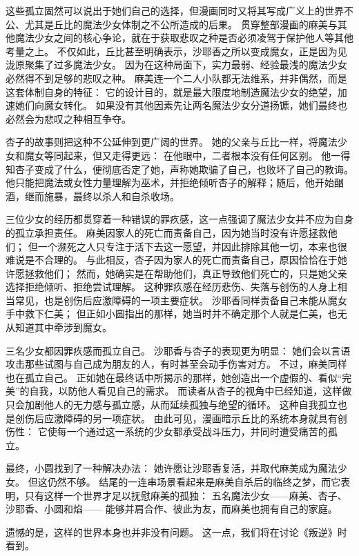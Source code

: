 这些孤立固然可以说出于她们自己的选择，但漫画同时又将其写成广义上的世界不公、尤其是丘比的魔法少女体制之不公所造成的后果。
贯穿整部漫画的麻美与其他魔法少女之间的核心争论，就在于获取悲叹之种是否必须凌驾于保护他人等其他考量之上。
不仅如此，丘比甚至明确表示，沙耶香之所以变成魔女，正是因为见泷原聚集了过多魔法少女。
因为在这种局面下，实力最弱、经验最浅的魔法少女必然得不到足够的悲叹之种。
麻美连一个二人小队都无法维系，并非偶然，而是这套体制自身的特征：
它的设计目的，就是最大限度地制造魔法少女的绝望，加速她们向魔女转化。
如果没有其他因素先让两名魔法少女分道扬镳，她们最终也必然会为悲叹之种相互争夺。

杏子的故事则把这种不公延伸到更广阔的世界。
她的父亲与丘比一样，将魔法少女和魔女等同起来，但又走得更远：
在他眼中，二者根本没有任何区别。
他一得知杏子变成了什么，便彻底否定了她，声称她欺骗了自己，也败坏了自己的教诲。
他只能把魔法或女性力量理解为巫术，并拒绝倾听杏子的解释；随后，他开始酗酒，继而施暴，最终以杀人和自杀收场。

三位少女的经历都贯穿着一种错误的罪疚感，这一点强调了魔法少女并不应为自身的孤立承担责任。
麻美因家人的死亡而责备自己，因为她当时没有许愿拯救他们；
但一个濒死之人只专注于活下去这一愿望，并因此排除其他一切，本来也很难说是不合理的。
与此相反，杏子因为家人的死亡而责备自己，原因恰恰在于她许愿拯救他们；
然而，她确实是在帮助他们，真正导致他们死亡的，只是她父亲选择拒绝倾听、拒绝尝试理解。
这种罪疚感在经历悲伤、失落与创伤的人身上相当常见，也是创伤后应激障碍的一项主要症状\cite{ref106}。
沙耶香同样责备自己未能从魔女手中救下仁美；
但正如小圆指出的那样，她当时并不确定那个人就是仁美，也无从知道其中牵涉到魔女。

三名少女都因罪疚感而孤立自己。
沙耶香与杏子的表现更为明显：
她们会以言语攻击那些试图与自己成为朋友的人，有时甚至会动手伤害对方。
不过，麻美同样也在孤立自己。
正如她在最终话中所揭示的那样，她创造出一个虚假的、看似“完美”的自我，以防他人看见自己的需求。
而读者从杏子的视角中已经知道，这样做只会加剧他人的无力感与孤立感，从而延续孤独与绝望的循环。
这种自我孤立也是创伤后应激障碍的另一项症状\cite{ref107}。
由此可见，漫画暗示丘比的系统本身就具有创伤性：
它使每一个通过这一系统的少女都承受战斗压力，并同时遭受痛苦的孤立。

最终，小圆找到了一种解决办法：
她许愿让沙耶香复活，并取代麻美成为魔法少女。
但这仍然不够。
结尾的一连串场景看起来是麻美自杀后的临终之梦，而它表明，只有这样一个世界才足以抚慰麻美的孤独：
五名魔法少女——麻美、杏子、沙耶香、小圆和焰——
能够并肩合作、彼此为友，而麻美也拥有自己的家庭。

遗憾的是，这样的世界本身也并非没有问题。
这一点，我们将在讨论《叛逆》时看到。